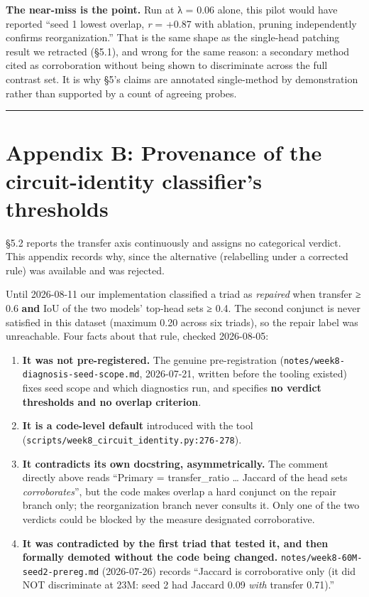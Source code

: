 \documentclass[11pt]{article}
\providecommand{\tightlist}{\setlength{\itemsep}{0pt}\setlength{\parskip}{0pt}}
\begin{document}
\textbf{The near-miss is the point.} Run at λ = 0.06 alone, this pilot would have reported ``seed 1
lowest overlap, \emph{r} = +0.87 with ablation, pruning independently confirms reorganization.''
That is the same shape as the single-head patching result we retracted (§5.1), and wrong for
the same reason: a secondary method cited as corroboration without being shown to
discriminate across the full contrast set. It is why §5's claims are annotated single-method
by demonstration rather than supported by a count of agreeing probes.

\begin{center}\rule{0.5\linewidth}{0.5pt}\end{center}

\section{Appendix B: Provenance of the circuit-identity classifier's thresholds}\label{appendix-b-provenance-of-the-circuit-identity-classifiers-thresholds}

§5.2 reports the transfer axis continuously and assigns no categorical verdict. This
appendix records why, since the alternative (relabelling under a corrected rule) was
available and was rejected.

Until 2026-08-11 our implementation classified a triad as \emph{repaired} when transfer ≥ 0.6
\textbf{and} IoU of the two models' top-head sets ≥ 0.4. The second conjunct is never satisfied in
this dataset (maximum 0.20 across six triads), so the repair label was unreachable. Four facts
about that rule, checked 2026-08-05:

\begin{enumerate}
\def\labelenumi{\arabic{enumi}.}
\tightlist
\item
  \textbf{It was not pre-registered.} The genuine pre-registration
  (\texttt{notes/week8-diagnosis-seed-scope.md}, 2026-07-21, written before the tooling existed)
  fixes seed scope and which diagnostics run, and specifies \textbf{no verdict thresholds and no
  overlap criterion}.
\item
  \textbf{It is a code-level default} introduced with the tool
  (\texttt{scripts/week8\_circuit\_identity.py:276-278}).
\item
  \textbf{It contradicts its own docstring, asymmetrically.} The comment directly above reads
  ``Primary = transfer\_ratio \ldots{} Jaccard of the head sets \emph{corroborates}'', but the code makes
  overlap a hard conjunct on the repair branch only; the reorganization branch never
  consults it. Only one of the two verdicts could be blocked by the measure designated
  corroborative.
\item
  \textbf{It was contradicted by the first triad that tested it, and then formally demoted
  without the code being changed.} \texttt{notes/week8-60M-seed2-prereg.md} (2026-07-26) records
  ``Jaccard is corroborative only (it did NOT discriminate at 23M: seed 2 had Jaccard 0.09
  \emph{with} transfer 0.71).''
\end{enumerate}
\end{document}
